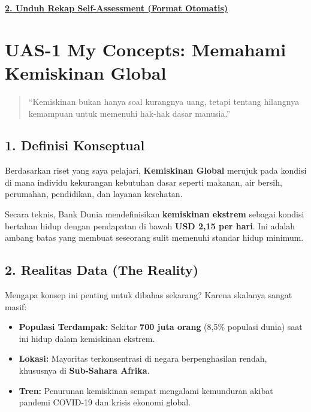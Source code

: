 \documentclass[
  letterpaper,
  DIV=11,
  numbers=noendperiod]{scrreprt}
\providecommand{\tightlist}{%
  \setlength{\itemsep}{0pt}\setlength{\parskip}{0pt}}
\begin{document}
\href{./Self-Assessment_UTS-1_s_d__UTS-5__dibuat_otomatis_.csv}{\textbf{2.
Unduh Rekap Self-Assessment (Format Otomatis)}}


\chapter{UAS-1 My Concepts: Memahami Kemiskinan
Global}\label{uas-1-my-concepts-memahami-kemiskinan-global}

\begin{quote}
``Kemiskinan bukan hanya soal kurangnya uang, tetapi tentang hilangnya
kemampuan untuk memenuhi hak-hak dasar manusia.''
\end{quote}

\section{1. Definisi Konseptual}\label{definisi-konseptual}

Berdasarkan riset yang saya pelajari, \textbf{Kemiskinan Global} merujuk
pada kondisi di mana individu kekurangan kebutuhan dasar seperti
makanan, air bersih, perumahan, pendidikan, dan layanan kesehatan.

Secara teknis, Bank Dunia mendefinisikan \textbf{kemiskinan ekstrem}
sebagai kondisi bertahan hidup dengan pendapatan di bawah \textbf{USD
2,15 per hari}. Ini adalah ambang batas yang membuat seseorang sulit
memenuhi standar hidup minimum.

\section{2. Realitas Data (The
Reality)}\label{realitas-data-the-reality}

Mengapa konsep ini penting untuk dibahas sekarang? Karena skalanya
sangat masif:

\begin{itemize}
\tightlist
\item
  \textbf{Populasi Terdampak:} Sekitar \textbf{700 juta orang} (8,5\%
  populasi dunia) saat ini hidup dalam kemiskinan ekstrem.
\item
  \textbf{Lokasi:} Mayoritas terkonsentrasi di negara berpenghasilan
  rendah, khususnya di \textbf{Sub-Sahara Afrika}.
\item
  \textbf{Tren:} Penurunan kemiskinan sempat mengalami kemunduran akibat
  pandemi COVID-19 dan krisis ekonomi global.
\end{itemize}
\end{document}
